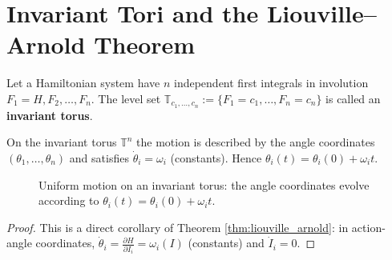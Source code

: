 \section{Invariant Tori and the Liouville--Arnold Theorem}
\label{sec:invariant_torus}

\begin{definition}\label{def:invariant_torus}
Let a Hamiltonian system have $n$ independent first integrals in involution $F_1 = H, F_2, \dots, F_n$. The level set $\mathbb{T}_{c_1, \dots, c_n} := \{F_1 = c_1, \dots, F_n = c_n\}$ is called an \textbf{invariant torus}.
\end{definition}

\begin{proposition}\label{prop:invariant_torus_motion}
On the invariant torus $\mathbb{T}^n$ the motion is described by the angle coordinates $(\theta_1, \dots, \theta_n)$ and satisfies $\dot{\theta}_i = \omega_i$ (constants). Hence $\theta_i(t) = \theta_i(0) + \omega_i t$.
\end{proposition}

\begin{figure}[htbp]
\centering
{}
\caption{Uniform motion on an invariant torus: the angle coordinates evolve according to $\theta_i(t)=\theta_i(0)+\omega_i t$.}
\label{fig:invariant_torus}
\end{figure}

\begin{proof}
This is a direct corollary of Theorem \ref{thm:liouville_arnold}: in action-angle coordinates, $\dot{\theta}_i = \frac{\partial H}{\partial I_i} = \omega_i(I)$ (constants) and $\dot{I}_i = 0$.
\end{proof}

